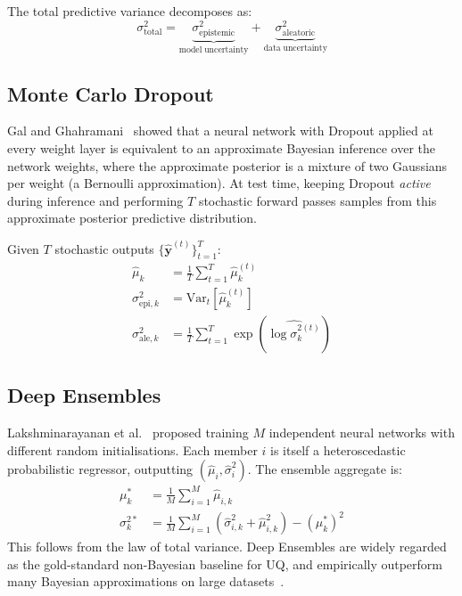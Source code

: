 \documentclass[12pt, a4paper, oneside]{report}
\begin{document}
The total predictive variance decomposes as:
\begin{equation}
  \sigma^2_{\mathrm{total}} = \underbrace{\sigma^2_{\mathrm{epistemic}}}_{\mathrm{model\;uncertainty}} + \underbrace{\sigma^2_{\mathrm{aleatoric}}}_{\mathrm{data\;uncertainty}}
\end{equation}

\subsection{Monte Carlo Dropout}

Gal and Ghahramani~\cite{gal2016} showed that a neural network with Dropout applied at every weight layer is equivalent to an approximate Bayesian inference over the network weights, where the approximate posterior is a mixture of two Gaussians per weight (a Bernoulli approximation). At test time, keeping Dropout \emph{active} during inference and performing $T$ stochastic forward passes samples from this approximate posterior predictive distribution.

Given $T$ stochastic outputs $\{\hat{\mathbf{y}}^{(t)}\}_{t=1}^T$:
\begin{align}
  \hat{\mu}_k      &= \frac{1}{T}\sum_{t=1}^T \hat{\mu}_k^{(t)} \label{eq:mc_mean}\\
  \sigma^2_{\mathrm{epi},k} &= \mathrm{Var}_t\!\left[\hat{\mu}_k^{(t)}\right] \label{eq:mc_epi}\\
  \sigma^2_{\mathrm{ale},k} &= \frac{1}{T}\sum_{t=1}^T \exp\!\left(\widehat{\log\sigma_k^{2(t)}}\right) \label{eq:mc_ale}
\end{align}

\subsection{Deep Ensembles}

Lakshminarayanan et al.~\cite{lakshminarayanan2017} proposed training $M$ independent neural networks with different random initialisations. Each member $i$ is itself a heteroscedastic probabilistic regressor, outputting $(\hat\mu_i, \hat\sigma^2_i)$. The ensemble aggregate is:
\begin{align}
  \mu^*_k &= \frac{1}{M}\sum_{i=1}^M \hat{\mu}_{i,k} \\
  \sigma^{2*}_k &= \frac{1}{M}\sum_{i=1}^M \left(\hat{\sigma}^2_{i,k} + \hat{\mu}^2_{i,k}\right) - \left(\mu^*_k\right)^2
\end{align}
This follows from the law of total variance. Deep Ensembles are widely regarded as the gold-standard non-Bayesian baseline for UQ, and empirically outperform many Bayesian approximations on large datasets~\cite{ovadia2019}.
\end{document}
